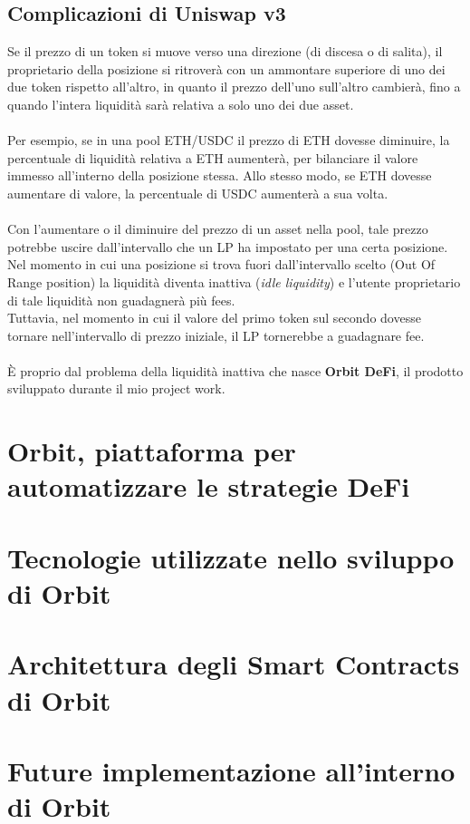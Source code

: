 \documentclass{report}
\begin{document}
\section{Complicazioni di Uniswap v3}

Se il prezzo di un token si muove verso una direzione (di discesa o di salita), il proprietario della posizione si ritroverà con un ammontare superiore di uno dei due token rispetto all'altro, in quanto il prezzo dell'uno sull'altro cambierà, fino a quando l'intera liquidità sarà relativa a solo uno dei due asset.
\\\\Per esempio, se in una pool ETH/USDC il prezzo di ETH dovesse diminuire, la percentuale di liquidità relativa a ETH aumenterà, per bilanciare il valore immesso all'interno della posizione stessa.
Allo stesso modo, se ETH dovesse aumentare di valore, la percentuale di USDC aumenterà a sua volta.
\\\\Con l'aumentare o il diminuire del prezzo di un asset nella pool, tale prezzo potrebbe uscire dall'intervallo che un LP ha impostato per una certa posizione. Nel momento in cui una posizione si trova fuori dall'intervallo scelto (Out Of Range position) la liquidità diventa inattiva (\textit{idle liquidity}) e l'utente proprietario di tale liquidità non guadagnerà più fees.
\\Tuttavia, nel momento in cui il valore del primo token sul secondo dovesse tornare nell'intervallo di prezzo iniziale, il LP tornerebbe a guadagnare fee.
\\\\È proprio dal problema della liquidità inattiva che nasce \textbf{Orbit DeFi}, il prodotto sviluppato durante il mio project work.







\chapter{Orbit, piattaforma per automatizzare le strategie DeFi}

\chapter{Tecnologie utilizzate nello sviluppo di Orbit}

\chapter{Architettura degli Smart Contracts di Orbit}

\chapter{Future implementazione all'interno di Orbit}




\end{document}

